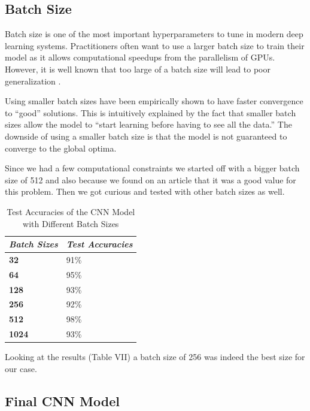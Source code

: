 \documentclass[conference]{IEEEtran}
\begin{document}
\subsection{Batch Size}

Batch size is one of the most important hyperparameters to tune in modern deep learning systems. Practitioners often want to use a larger batch size to train their model as it allows computational speedups from the parallelism of GPUs. However, it is well known that too large of a batch size will lead to poor generalization \cite{medium_Shen}.

Using smaller batch sizes have been empirically shown to have faster convergence to “good” solutions. This is intuitively explained by the fact that smaller batch sizes allow the model to “start learning before having to see all the data.” The downside of using a smaller batch size is that the model is not guaranteed to converge to the global optima. 

Since we had a few computational constraints we started off with a bigger batch size of 512 and also because we found on an article \cite{analytics} that it was a good value for this problem. Then we got curious and tested with other batch sizes as well.

\begin{table}[htbp]
\caption{Test Accuracies of the CNN Model with Different Batch Sizes}
\begin{center}
\begin{tabular}{|p{2cm}|p{2cm}|}
\hline
\textbf{\textit{Batch Sizes}} & \textbf{\textit{Test Accuracies}} \\
\hline
\textbf{32} & 91\% \\
\hline
\textbf{64} & 95\% \\
\hline
\textbf{128} & 93\% \\
\hline
\textbf{256} & 92\% \\
\hline
\textbf{512} & 98\% \\
\hline
\textbf{1024} & 93\% \\
\hline
\end{tabular}
\end{center}
\end{table}

Looking at the results (Table VII) a batch size of 256 was indeed the best size for our case.

\subsection{Final CNN Model}
\end{document}

